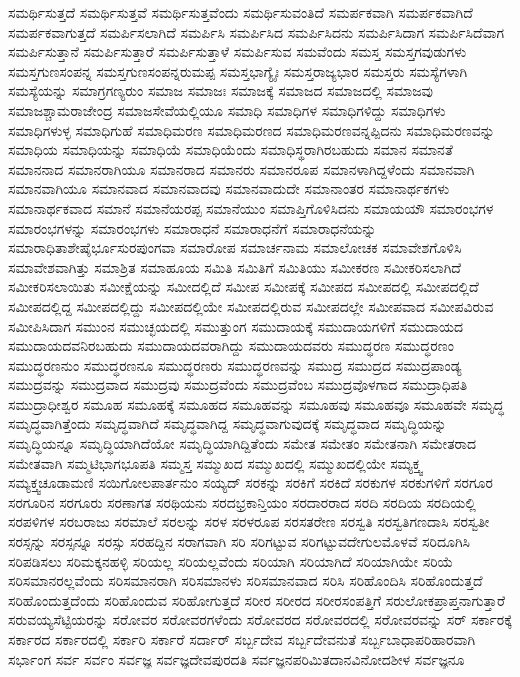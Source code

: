 {ಸಮರ್ಥಿಸುತ್ತದೆ
ಸಮರ್ಥಿಸುತ್ತವೆ
ಸಮರ್ಥಿಸುತ್ತವೆಂದು
ಸಮರ್ಥಿಸುವಂತಿದೆ
ಸಮರ್ಪಕವಾಗಿ
ಸಮರ್ಪಕವಾಗಿದೆ
ಸಮರ್ಪಕವಾಗುತ್ತದೆ
ಸಮರ್ಪಿಸಲಾಗಿದೆ
ಸಮರ್ಪಿಸಿ
ಸಮರ್ಪಿಸಿದ
ಸಮರ್ಪಿಸಿದನು
ಸಮರ್ಪಿಸಿದಾಗ
ಸಮರ್ಪಿಸಿದೆವಾಗ
ಸಮರ್ಪಿಸುತ್ತಾನೆ
ಸಮರ್ಪಿಸುತ್ತಾರೆ
ಸಮರ್ಪಿಸುತ್ತಾಳೆ
ಸಮರ್ಪಿಸುವ
ಸಮವೆಂದು
ಸಮಸ್ತ
ಸಮಸ್ತಗವುಡುಗಳು
ಸಮಸ್ತಗುಣಸಂಪನ್ನ
ಸಮಸ್ತಗುಣಸಂಪನ್ನರುಮಪ್ಪ
ಸಮಸ್ತಭಾಗ್ಯೈಃ
ಸಮಸ್ತರಾಜ್ಯಭಾರ
ಸಮಸ್ತರು
ಸಮಸ್ಯೆಗಳಾಗಿ
ಸಮಸ್ಯೆಯನ್ನು
ಸಮಾಗ್ರಗಣ್ಯರುಂ
ಸಮಾಜ
ಸಮಾಜಃ
ಸಮಾಜಕ್ಕೆ
ಸಮಾಜದ
ಸಮಾಜದಲ್ಲಿ
ಸಮಾಜವು
ಸಮಾಜಶ್ಚಾಮರಾಜೇಂದ್ರ
ಸಮಾಜಸೇವೆಯಲ್ಲಿಯೂ
ಸಮಾಧಿ
ಸಮಾಧಿಗಳ
ಸಮಾಧಿಗಳಿದ್ದು
ಸಮಾಧಿಗಳು
ಸಮಾಧಿಗಳುಳ್ಳ
ಸಮಾಧಿಗುಹೆ
ಸಮಾಧಿಮರಣ
ಸಮಾಧಿಮರಣದ
ಸಮಾಧಿಮರಣವನ್ನಪ್ಪಿದನು
ಸಮಾಧಿಮರಣವನ್ನು
ಸಮಾಧಿಯ
ಸಮಾಧಿಯನ್ನು
ಸಮಾಧಿಯೆ
ಸಮಾಧಿಯೆಂದು
ಸಮಾಧಿಸ್ಥರಾಗಿರಬಹುದು
ಸಮಾನ
ಸಮಾನತೆ
ಸಮಾನನಾದ
ಸಮಾನರಾಗಿಯೂ
ಸಮಾನರಾದ
ಸಮಾನರು
ಸಮಾನರೂಪ
ಸಮಾನಳಾಗಿದ್ದಳೆಂದು
ಸಮಾನವಾಗಿ
ಸಮಾನವಾಗಿಯೂ
ಸಮಾನವಾದ
ಸಮಾನವಾದವು
ಸಮಾನವಾದುದೇ
ಸಮಾನಾಂತರ
ಸಮಾನಾರ್ಥಕಗಳು
ಸಮಾನಾರ್ಥಕವಾದ
ಸಮಾನೆ
ಸಮಾನೆಯರಪ್ಪ
ಸಮಾನೆಯುಂ
ಸಮಾಪ್ತಿಗೊಳಿಸಿದನು
ಸಮಾಯಯೌ
ಸಮಾರಂಭಗಳ
ಸಮಾರಂಭಗಳನ್ನು
ಸಮಾರಂಭಗಳು
ಸಮಾರಾಧನೆ
ಸಮಾರಾಧನೆಗೆ
ಸಮಾರಾಧನೆಯನ್ನು
ಸಮಾರಾಧಿತಾಶೇಷೈರ್ಭೂಸುರಪುಂಗವಾ
ಸಮಾರೋಪ
ಸಮಾರ್ಚನಾಮ
ಸಮಾಲೋಚಕ
ಸಮಾವೇಶಗೊಳಿಸಿ
ಸಮಾವೇಶವಾಗಿತ್ತು
ಸಮಾಶ್ರಿತ
ಸಮಾಹೂಯ
ಸಮಿತಿ
ಸಮಿತಿಗೆ
ಸಮಿತಿಯು
ಸಮೀಕರಣ
ಸಮೀಕರಿಸಲಾಗಿದೆ
ಸಮೀಕರಿಸಲಾಯಿತು
ಸಮೀಕ್ಷೆಯನ್ನು
ಸಮೀದಲ್ಲಿದೆ
ಸಮೀಪ
ಸಮೀಪಕ್ಕೆ
ಸಮೀಪದ
ಸಮೀಪದಲ್ಲಿ
ಸಮೀಪದಲ್ಲಿದೆ
ಸಮೀಪದಲ್ಲಿದ್ದ
ಸಮೀಪದಲ್ಲಿದ್ದು
ಸಮೀಪದಲ್ಲಿಯೇ
ಸಮೀಪದಲ್ಲಿರುವ
ಸಮೀಪದಲ್ಲೇ
ಸಮೀಪವಾದ
ಸಮೀಪವಿರುವ
ಸಮೀಪಿಸಿದಾಗ
ಸಮುಂನ
ಸಮುಚ್ಛಯದಲ್ಲಿ
ಸಮುತ್ತುಂಗ
ಸಮುದಾಯಕ್ಕೆ
ಸಮುದಾಯಗಳಿಗೆ
ಸಮುದಾಯದ
ಸಮುದಾಯದವನಿರಬಹುದು
ಸಮುದಾಯದವರಾಗಿದ್ದು
ಸಮುದಾಯದವರು
ಸಮುದ್ಧರಣ
ಸಮುದ್ಧರಣಂ
ಸಮುದ್ಧರಣನುಂ
ಸಮುದ್ಧರಣನೂ
ಸಮುದ್ಧರಣರು
ಸಮುದ್ಧರಣವನ್ನು
ಸಮುದ್ರ
ಸಮುದ್ರದ
ಸಮುದ್ರಪಾಂಡ್ಯ
ಸಮುದ್ರವನ್ನು
ಸಮುದ್ರವಾದ
ಸಮುದ್ರವು
ಸಮುದ್ರವೆಂದು
ಸಮುದ್ರವೆಂಬ
ಸಮುದ್ರವೊಳಗಾದ
ಸಮುದ್ರಾಧಿಪತಿ
ಸಮುದ್ರಾಧೀಶ್ವರ
ಸಮೂಹ
ಸಮೂಹಕ್ಕೆ
ಸಮೂಹದ
ಸಮೂಹವನ್ನು
ಸಮೂಹವು
ಸಮೂಹವೂ
ಸಮೂಹವೇ
ಸಮೃದ್ಧ
ಸಮೃದ್ಧವಾಗಿತ್ತೆಂದು
ಸಮೃದ್ಧವಾಗಿದೆ
ಸಮೃದ್ಧವಾಗಿದ್ದ
ಸಮೃದ್ಧವಾಗುವುದಕ್ಕೆ
ಸಮೃದ್ಧವಾದ
ಸಮೃದ್ಧಿಯನ್ನು
ಸಮೃದ್ಧಿಯನ್ನೂ
ಸಮೃದ್ಧಿಯಾಗಿದೆಯೋ
ಸಮೃದ್ಧಿಯಾಗಿದ್ದಿತೆಂದು
ಸಮೇತ
ಸಮೇತಂ
ಸಮೇತನಾಗಿ
ಸಮೇತರಾದ
ಸಮೇತವಾಗಿ
ಸಮ್ಮಟಿಭಾಗಭೂಪತಿ
ಸಮ್ಮಸ್ತ
ಸಮ್ಮುಖದ
ಸಮ್ಮುಖದಲ್ಲಿ
ಸಮ್ಮುಖದಲ್ಲಿಯೇ
ಸಮ್ಯಕ್ತ್ವ
ಸಮ್ಯಕ್ತ್ವಚೂಡಾಮಣಿ
ಸಯಿಗೋಲಪಾರ್ತನುಂ
ಸಯ್ಯದ್
ಸರಕನ್ನು
ಸರಕಿಗೆ
ಸರಕಿದೆ
ಸರಕುಗಳ
ಸರಕುಗಳಿಗೆ
ಸರಗೂರ
ಸರಗೂರಿನ
ಸರಗೂರು
ಸರಣಾಗತ
ಸರಥಿಯನು
ಸರದಭ್ರಕಾನ್ತಿಯಂ
ಸರದಾರರಾದ
ಸರದಿ
ಸರದಿಯ
ಸರದಿಯಲ್ಲಿ
ಸರಪಳಿಗಳ
ಸರಬರಾಜು
ಸರಮಾಲೆ
ಸರಲನ್ನು
ಸರಳ
ಸರಳರೂಪ
ಸರಸತರೇಣ
ಸರಸ್ವತಿ
ಸರಸ್ವತಿಗಣದಾಸಿ
ಸರಸ್ವತೀ
ಸರಸ್ಸನ್ನು
ಸರಸ್ಸನ್ನೂ
ಸರಸ್ಸು
ಸರಹದ್ದಿನ
ಸರಾಗವಾಗಿ
ಸರಿ
ಸರಿಗಟ್ಟುವ
ಸರಿಗಟ್ಟುವದೇಗುಲಮೊಳವೆ
ಸರಿದೂಗಿಸಿ
ಸರಿಪಡಿಸಲು
ಸರಿಮಕ್ಕನಹಳ್ಳಿ
ಸರಿಯಲ್ಲ
ಸರಿಯಲ್ಲವೆಂದು
ಸರಿಯಾಗಿ
ಸರಿಯಾಗಿದೆ
ಸರಿಯಾಗಿಯೇ
ಸರಿಯೆ
ಸರಿಸಮಾನರಲ್ಲವೆಂದು
ಸರಿಸಮಾನರಾಗಿ
ಸರಿಸಮಾನಳು
ಸರಿಸಮಾನವಾದ
ಸರಿಸಿ
ಸರಿಹೊಂದಿಸಿ
ಸರಿಹೊಂದುತ್ತದೆ
ಸರಿಹೊಂದುತ್ತದೆಂದು
ಸರಿಹೊಂದುವ
ಸರಿಹೋಗುತ್ತದೆ
ಸರೀರ
ಸರೀರದ
ಸರೀರಸಂಪತ್ತಿಗೆ
ಸರುಲೋಕಪ್ರಾಪ್ತನಾಗುತ್ತಾರೆ
ಸರುವಯ್ಯಸೆಟ್ಟಿಯರನ್ನು
ಸರೋವರ
ಸರೋವರಗಳೆಂದು
ಸರೋವರದ
ಸರೋವರದಲ್ಲಿ
ಸರೋವರವನ್ನು
ಸರ್
ಸರ್ಕಾರಕ್ಕೆ
ಸರ್ಕಾರದ
ಸರ್ಕಾರದಲ್ಲಿ
ಸರ್ಕಾರಿ
ಸರ್ಕಾರೆ
ಸರ್ದಾರ್
ಸರ್ಬ್ಬದೇವ
ಸರ್ಬ್ಬದೇವನುತೆ
ಸರ್ಬ್ಬಬಾಧಾಪರಿಹಾರವಾಗಿ
ಸರ್ಭಾಂಗ
ಸರ್ವ
ಸರ್ವಂ
ಸರ್ವಜ್ಞ
ಸರ್ವಜ್ಞದೇವಪುರದತಿ
ಸರ್ವಜ್ಞನಪರಿಮಿತದಾನವಿನೋದಶೀಳ
ಸರ್ವಜ್ಞನೂ
}
